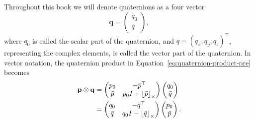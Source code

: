 Throughout this book we will denote quaternions as a four vector
\[
\mathbf{q} = \begin{pmatrix} q_0 \\ \bar{q} \end{pmatrix},
\]
where $q_0$ is called the scalar part of the quaternion, and $\bar{q} = (q_x, q_y, q_z)^\top$, representing the complex elements, is called the vector part of the quaternion.  In vector notation, the quaternion product in Equation~\eqref{eq:quaternion-product-pre} becomes
\begin{align}
\mathbf{p}\otimes\mathbf{q} &= \begin{pmatrix} p_0 & -\bar{p}^\top \\ \bar{p} & p_0I + \ss{\bar{p}} \end{pmatrix}\begin{pmatrix}q_0 \\ \bar{q}\end{pmatrix} \label{eq:quaternion_multiplication_1}\\
&= \begin{pmatrix} q_0 & -\bar{q}^\top \\ \bar{q} & q_0I-\ss{\bar{q}} \end{pmatrix}\begin{pmatrix}p_0 \\ \bar{p}\end{pmatrix}.
\label{eq:quaternion_multiplication_2}
\end{align}

